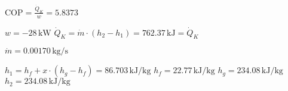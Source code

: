 \( \text{COP} = \frac{\dot{Q}_K}{w} = 5.8373 \)  

\( w = -28 \, \text{kW} \)  
\( \dot{Q}_K = \dot{m} \cdot (h_2 - h_1) = 762.37 \, \text{kJ} = \dot{Q}_K \)  

\( \dot{m} = 0.00170 \, \text{kg/s} \)  

\( h_1 = h_f + x \cdot (h_g - h_f) = 86.703 \, \text{kJ/kg} \)  
\( h_f = 22.77 \, \text{kJ/kg} \)  
\( h_g = 234.08 \, \text{kJ/kg} \)  
\( h_2 = 234.08 \, \text{kJ/kg} \)